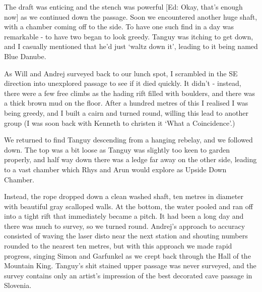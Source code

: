 The draft was enticing and the stench was powerful [Ed: Okay, that’s enough now] as we continued down the passage. Soon we encountered another huge shaft, with a chamber coming off to the side. To have one such find in a day was remarkable - to have two began to look greedy. Tanguy was itching to get down, and I casually mentioned that he’d just ‘waltz down it’, leading to it being named Blue Danube.

 
As Will and Andrej surveyed back to our lunch spot, I scrambled in the SE direction into unexplored passage to see if it died quickly. It didn’t - instead, there were a few free climbs as the hading rift filled with boulders, and there was a thick brown mud on the floor. After a hundred metres of this I realised I was being greedy, and I built a cairn and turned round, willing this lead to another group (I was soon back with Kenneth to christen it ‘What a Coincidence’.)
 
We returned to find Tanguy descending from a hanging rebelay, and we followed down. The top was a bit loose as Tanguy was slightly too keen to garden properly, and half way down there was a ledge far away on the other side, leading to a vast chamber which Rhys and Arun would explore as Upside Down Chamber.
 
Instead, the rope dropped down a clean washed shaft, ten metres in diameter with beautiful gray scalloped walls. At the bottom, the water pooled and ran off into a tight rift that immediately became a pitch. It had been a long day and there was much to survey, so we turned round. Andrej’s approach to accuracy consisted of waving the laser disto near the next station and shouting numbers rounded to the nearest ten metres, but with this approach we made rapid progress, singing Simon and Garfunkel as we crept back through the Hall of the Mountain King. Tanguy’s shit stained upper passage was never surveyed, and the survey contains only an artist's impression of the best decorated cave passage in Slovenia.



